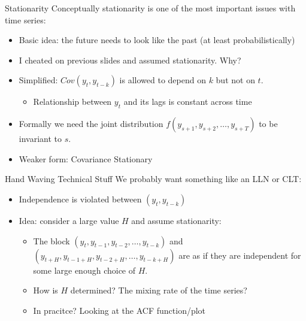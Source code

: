 \documentclass[aspectratio=169]{beamer}
\begin{document}
\begin{frame}{Stationarity}
Conceptually \alert{stationarity} is one of the most important issues with time series:
\begin{itemize}
\item Basic idea: the future needs to look like the past (at least probabilistically)
\item I cheated on previous slides and assumed stationarity. Why?
\item Simplified: $Cov(y_t,y_{t-k})$ is allowed to depend on $k$ but not on $t$.
\begin{itemize}
\item Relationship between $y_t$ and its lags is constant across time
\end{itemize}
\item Formally we need the joint distribution $f(y_{s+1},y_{s+2},\ldots,y_{s+T})$ to be invariant to $s$.
\item Weaker form: Covariance Stationary
\end{itemize}
\end{frame}

\begin{frame}{Hand Waving Technical Stuff}
We probably want something like an LLN or CLT:
\begin{itemize}
\item \alert{Independence} is violated between $(y_t,y_{t-k})$
\item Idea: consider a large value $H$ and assume \alert{stationarity}:
\begin{itemize}
\item The block $(y_t,y_{t-1},y_{t-2},\ldots,y_{t-k})$ and $(y_{t+H},y_{t-1+H},y_{t-2+H},\ldots,y_{t-k+H})$ are as if they are independent for some large enough choice of $H$.
\item How is $H$ determined? The \alert{mixing rate} of the time series?
\item In pracitce? Looking at the ACF function/plot
\end{itemize}
\end{itemize}
\end{frame}
\end{document}
